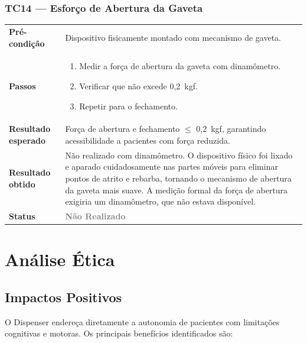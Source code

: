 \documentclass[12pt,a4paper]{article}
\newcommand{\lightrule}{\arrayrulecolor{gray!35}\midrule\arrayrulecolor{black}}
\newcommand{\naorealizado}{\textcolor{gray}{\textbf{Não Realizado}}}
\begin{document}
\subsubsection{TC14 — Esforço de Abertura da Gaveta}
\begin{table}[H]\small\setlength{\tabcolsep}{6pt}\renewcommand{\arraystretch}{1.3}
\begin{tabularx}{\textwidth}{>{\bfseries}p{4cm} X}
\toprule
Pré-condição & Dispositivo fisicamente montado com mecanismo de gaveta. \\
\lightrule
Passos &
\begin{enumerate}[nosep,leftmargin=*]
  \item Medir a força de abertura da gaveta com dinamômetro.
  \item Verificar que não excede 0,2~kgf.
  \item Repetir para o fechamento.
\end{enumerate} \\
\lightrule
Resultado esperado & Força de abertura e fechamento $\leq$ 0,2~kgf, garantindo acessibilidade a pacientes com força reduzida. \\
\lightrule
Resultado obtido & Não realizado com dinamômetro. O dispositivo físico foi lixado e aparado cuidadosamente nas partes móveis para eliminar pontos de atrito e rebarba, tornando o mecanismo de abertura da gaveta mais suave. A medição formal da força de abertura exigiria um dinamômetro, que não estava disponível. \\
\lightrule
Status & \naorealizado \\
\bottomrule
\end{tabularx}\end{table}

\newpage

\section{Análise Ética}

\subsection{Impactos Positivos}

O Dispenser endereça diretamente a autonomia de pacientes com limitações cognitivas e motoras. Os principais benefícios identificados são:
\end{document}
